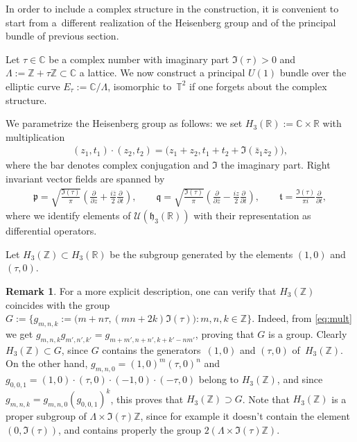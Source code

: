 \documentclass[pdftex]{sigma}
\numberwithin{equation}{section}
\theoremstyle{definition}
\newtheorem{rem}[thm]{Remark}
\newcommand{\U}{\mathcal{U}}
\newcommand{\R}{\mathbb{R}}
\newcommand{\C}{\mathbb{C}}
\newcommand{\Z}{\mathbb{Z}}
\newcommand{\T}{\mathbb{T}}
\newcommand{\mf}{\mathfrak}
\newcommand{\ga}{\mf{p}}
\newcommand{\gb}{\mf{q}}
\newcommand{\gc}{\mf{t}}
\begin{document}
In order to include a complex structure in the construction, it is convenient to start from a~dif\/ferent realization of the Heisenberg group and of the principal bundle of previous section.

Let $\tau\in\C$ be a complex number with imaginary part $\Im(\tau)>0$ and
$\Lambda:=\Z+\tau\Z\subset\C$ a lattice.
We now construct a principal $U(1)$ bundle over the elliptic curve $E_\tau:=\C/\Lambda$, isomorphic to~$\T^2$ if one forgets about the complex structure.

We parametrize the Heisenberg group as follows: we set $H_3(\R):=\C\times\R$ with multiplication
\begin{gather}\label{eq:mult}
(z_1,t_1)\cdot(z_2,t_2)=\big(z_1+z_2,t_1+t_2+\Im(\bar z_1z_2)\big),
\end{gather}
where the bar denotes complex conjugation and $\Im$ the imaginary part.
Right invariant vector f\/ields are spanned by
\begin{gather}\label{eq:rivf}
\ga=\sqrt{\frac{\Im(\tau)}{\pi}}\left(\frac{\partial}{\partial z}
+\frac{i\bar z}{2}\frac{\partial}{\partial t}
\right)
,\qquad
\gb=\sqrt{\frac{\Im(\tau)}{\pi}}
\left(\frac{\partial}{\partial\bar z}
-\frac{iz}{2}\frac{\partial}{\partial t}
\right)
,\qquad
\gc=\frac{\Im(\tau)}{\pi i}\frac{\partial}{\partial t}
,
\end{gather}
where we identify elements of $\U(\mf{h}_3(\R))$ with their representation as dif\/ferential operators.

Let $H_3(\Z)\subset H_3(\R)$ be the subgroup generated by the elements $(1,0)$ and $(\tau,0)$.

\begin{rem}
For a more explicit description, one can verify that $H_3(\Z)$
coincides with the group
$G:=\big\{g_{m,n,k}:=\big(m+n\tau,(mn+2k)\Im(\tau)\big)\colon m,n,k\in\Z\big\}$. Indeed, from \eqref{eq:mult} we get
$g_{m,n,k}g_{m',n',k'}=g_{m+m',n+n',k+k'-nm'}$, proving that $G$ is a group.
Clearly $H_3(\Z)\subset G$, since $G$ contains the generators~$(1,0)$ and $(\tau,0)$ of~$H_3(\Z)$.
On the other hand, $g_{m,n,0}=(1,0)^m(\tau,0)^n$ and
$g_{0,0,1}=(1,0)\cdot (\tau,0)\cdot (-1,0)\cdot (-\tau,0)$
belong to $H_3(\Z)$, and since $g_{m,n,k}=g_{m,n,0}(g_{0,0,1})^k$,
this proves that $H_3(\Z)\supset G$.
Note that $H_3(\Z)$ is a proper subgroup of $\Lambda\times \Im(\tau)\Z$, since for example it doesn't contain the element $(0,\Im(\tau))$, and contains properly the group $2(\Lambda\times \Im(\tau)\Z)$.
\end{rem}
\end{document}
